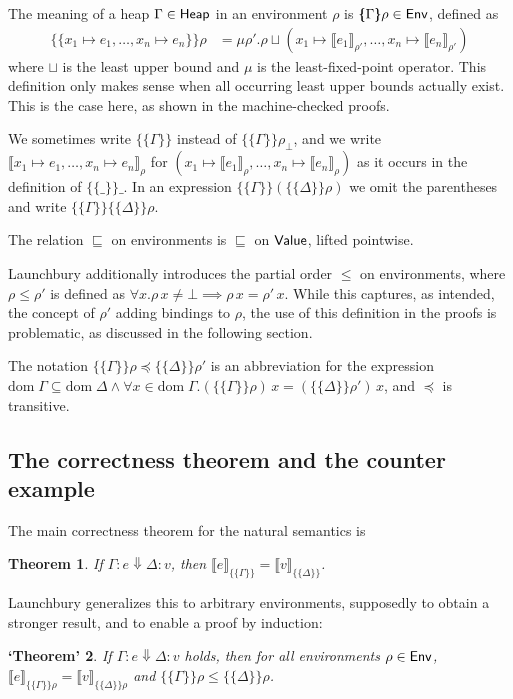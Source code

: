 \documentclass[twopage]{scrartcl}
\newtheorem{theorem}{Theorem}
\newtheorem{falsetheorem}[theorem]{‘Theorem’}
\theoremstyle{nonumberbreak}
\newcommand{\sHeap} {\text{\textsf{Heap}}}
\newcommand{\sValue}{\text{\textsf{Value}}}
\newcommand{\sEnv}  {\text{\textsf{Env}}}
\newcommand{\sred}[4]{#1 : #2 \Downarrow #3 : #4}
\newcommand{\dom}[1]{\text{dom}\;#1}
\newcommand{\xen}{x_1\mapsto e_1, \ldots, x_n\mapsto e_n}
\newcommand{\dsem}[2]{\llbracket #1 \rrbracket_{#2}}
\newcommand{\esem}[1]{\{\!\!\!\{#1\}\!\!\!\}}
\begin{document}
The meaning of a heap $\Gamma \in \sHeap$ in an environment $\rho$ is $\esem \Gamma \rho \in \sEnv$, defined as
\begin{align*}
\esem{ \xen}\rho 
&= \mu \rho'. \rho \sqcup (x_1 \mapsto \dsem{e_1}{\rho'}, \ldots, x_n \mapsto \dsem{e_n}{\rho'})
\end{align*}
where $\sqcup$ is the least upper bound and $\mu$ is the least-fixed-point operator. This definition only makes sense when all occurring least upper bounds actually exist. This is the case here, as shown in the machine-checked proofs.

We sometimes write $\esem{\Gamma}$ instead of $\esem{\Gamma}{\rho_\bot}$, and we write $\dsem{\xen}\rho$ for $(x_1\mapsto \dsem{e_1}\rho,\ldots,x_n\mapsto \dsem{e_n}\rho)$ as it occurs in the definition of $\esem{\_}\_$. In an expression $\esem{\Gamma}(\esem{\Delta}\rho)$ we omit the parentheses and write $\esem{\Gamma}\esem{\Delta}\rho$.

The relation $\sqsubseteq$ on environments is $\sqsubseteq$ on $\sValue$, lifted pointwise.

Launchbury additionally introduces the partial order $\le$ on environments, where $\rho \le \rho'$ is defined as $\forall x. \rho\, x \ne \bot \implies \rho\,x =\rho'\,x$. While this captures, as intended, the concept of $\rho'$ adding bindings to $\rho$, the use of this definition in the proofs is problematic, as discussed in the following section.

The notation $\esem{\Gamma}\rho \preceq \esem{\Delta}{\rho'}$ is an abbreviation for the expression $\dom\Gamma \subseteq \dom\Delta \wedge \forall x\in \dom\Gamma. (\esem{\Gamma}\rho)\,x = (\esem{\Delta}{\rho'})\,x$, and $\preceq$ is transitive.


\subsection{The correctness theorem and the counter example}
\label{counterexample}

The main correctness theorem for the natural semantics is
\begin{theorem}
If $\sred \Gamma e \Delta v$, then $\dsem{e}{\esem{\Gamma}} = \dsem{v}{\esem{\Delta}}$.
\label{thm:main}
\end{theorem}

Launchbury generalizes this to arbitrary environments, supposedly to obtain a stronger result, and to enable a proof by induction:

\begin{falsetheorem}
If $\sred \Gamma e \Delta v$ holds, then for all environments $\rho \in \sEnv$, $\dsem{e}{\esem{\Gamma}{\rho}} = \dsem{v}{\esem{\Delta}{\rho}}$ and $\esem\Gamma\rho \le \esem\Delta\rho$.%
\label{thm:false}
\end{falsetheorem}
\end{document}
